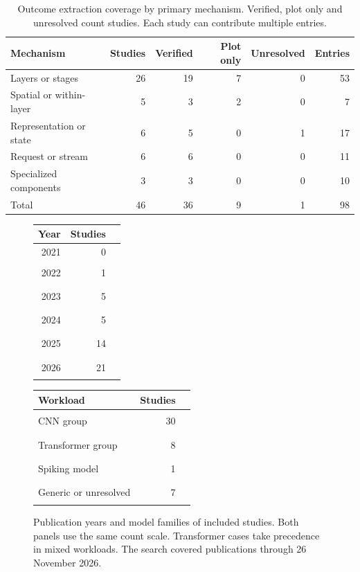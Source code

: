 \documentclass[pdflatex,sn-vancouver-num]{sn-jnl}
\begin{document}
\begin{table}[tb]
\caption{Outcome extraction coverage by primary mechanism. Verified, plot only and unresolved count studies. Each study can contribute multiple entries.}\label{tab:coverage}
\centering\small
\begin{tabular}{@{}p{.31\linewidth}rrrrr@{}}
\toprule
Mechanism & Studies & Verified & Plot only & Unresolved & Entries\\
\midrule
Layers or stages & 26 & 19 & 7 & 0 & 53\\
Spatial or within-layer & 5 & 3 & 2 & 0 & 7\\
Representation or state & 6 & 5 & 0 & 1 & 17\\
Request or stream & 6 & 6 & 0 & 0 & 11\\
Specialized components & 3 & 3 & 0 & 0 & 10\\
\midrule
Total & 46 & 36 & 9 & 1 & 98\\
\bottomrule
\end{tabular}
\end{table}

\begin{figure}[tb]
\centering\small
\begin{minipage}[t]{.38\linewidth}
\centering
\begin{tabular}{@{}rrl@{}}
\toprule
Year & Studies & \\
\midrule
2021 & 0 & \\
2022 & 1 & \rule{.65mm}{2.9mm}\\
2023 & 5 & \rule{3.25mm}{2.9mm}\\
2024 & 5 & \rule{3.25mm}{2.9mm}\\
2025 & 14 & \rule{9.10mm}{2.9mm}\\
2026 & 21 & \rule{13.65mm}{2.9mm}\\
\bottomrule
\end{tabular}
\end{minipage}\hfill
\begin{minipage}[t]{.59\linewidth}
\centering
\begin{tabular}{@{}lrl@{}}
\toprule
Workload & Studies & \\
\midrule
CNN group & 30 & \rule{19.50mm}{2.9mm}\\
Transformer group & 8 & \rule{5.20mm}{2.9mm}\\
Spiking model & 1 & \rule{.65mm}{2.9mm}\\
Generic or unresolved & 7 & \rule{4.55mm}{2.9mm}\\
\bottomrule
\end{tabular}
\end{minipage}
\caption{Publication years and model families of included studies. Both panels use the same count scale. Transformer cases take precedence in mixed workloads. The search covered publications through 26 November 2026.}
\label{fig:years}
\end{figure}
\end{document}
